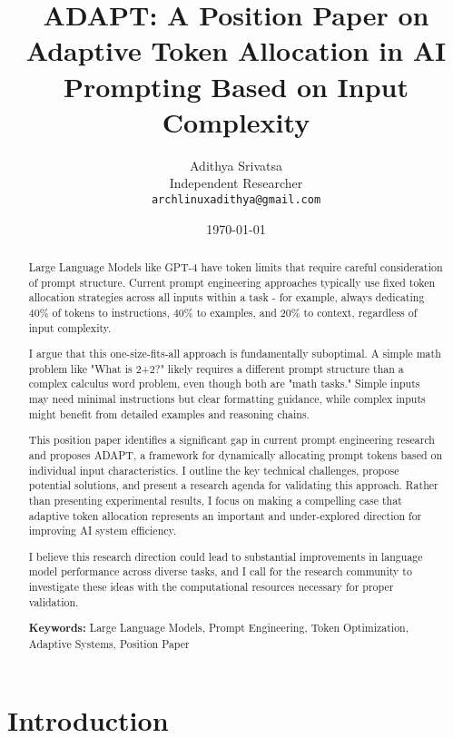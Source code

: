 \documentclass[11pt,a4paper]{article}
\title{ADAPT: A Position Paper on Adaptive Token Allocation in AI Prompting Based on Input Complexity}
\author{
Adithya Srivatsa \\
Independent Researcher \\
\texttt{archlinuxadithya@gmail.com}
}
\date{\today}
\begin{document}
\maketitle


\begin{abstract}
Large Language Models like GPT-4 have token limits that require careful consideration of prompt structure. Current prompt engineering approaches typically use fixed token allocation strategies across all inputs within a task - for example, always dedicating 40\% of tokens to instructions, 40\% to examples, and 20\% to context, regardless of input complexity.

I argue that this one-size-fits-all approach is fundamentally suboptimal. A simple math problem like "What is 2+2?" likely requires a different prompt structure than a complex calculus word problem, even though both are "math tasks." Simple inputs may need minimal instructions but clear formatting guidance, while complex inputs might benefit from detailed examples and reasoning chains.

This position paper identifies a significant gap in current prompt engineering research and proposes ADAPT, a framework for dynamically allocating prompt tokens based on individual input characteristics. I outline the key technical challenges, propose potential solutions, and present a research agenda for validating this approach. Rather than presenting experimental results, I focus on making a compelling case that adaptive token allocation represents an important and under-explored direction for improving AI system efficiency.

I believe this research direction could lead to substantial improvements in language model performance across diverse tasks, and I call for the research community to investigate these ideas with the computational resources necessary for proper validation.

\textbf{Keywords:} Large Language Models, Prompt Engineering, Token Optimization, Adaptive Systems, Position Paper
\end{abstract}

\section{Introduction}
\end{document}
